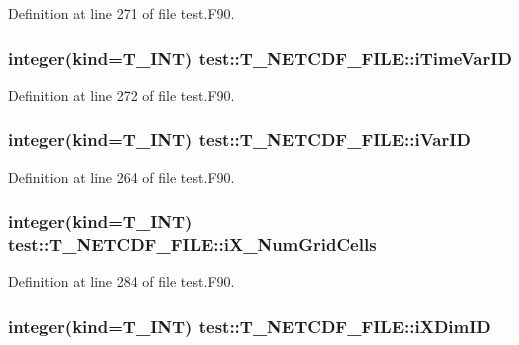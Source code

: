 Definition at line 271 of file test.F90.

\hypertarget{typetest_1_1_t___n_e_t_c_d_f___f_i_l_e_a1d3d22226f3c6ade469df5560926f3c7}{
\subsubsection[{iTimeVarID}]{\setlength{\rightskip}{0pt plus 5cm}integer(kind={\bf T\_\-INT}) {\bf test::T\_\-NETCDF\_\-FILE::iTimeVarID}}}
\label{typetest_1_1_t___n_e_t_c_d_f___f_i_l_e_a1d3d22226f3c6ade469df5560926f3c7}


Definition at line 272 of file test.F90.

\hypertarget{typetest_1_1_t___n_e_t_c_d_f___f_i_l_e_a56a2cb10e94b6f2e3cbf5560c0762bf6}{
\subsubsection[{iVarID}]{\setlength{\rightskip}{0pt plus 5cm}integer(kind={\bf T\_\-INT}) {\bf test::T\_\-NETCDF\_\-FILE::iVarID}}}
\label{typetest_1_1_t___n_e_t_c_d_f___f_i_l_e_a56a2cb10e94b6f2e3cbf5560c0762bf6}


Definition at line 264 of file test.F90.

\hypertarget{typetest_1_1_t___n_e_t_c_d_f___f_i_l_e_a2e8fa831b376d9295f1a192e123244c2}{
\subsubsection[{iX\_\-NumGridCells}]{\setlength{\rightskip}{0pt plus 5cm}integer(kind={\bf T\_\-INT}) {\bf test::T\_\-NETCDF\_\-FILE::iX\_\-NumGridCells}}}
\label{typetest_1_1_t___n_e_t_c_d_f___f_i_l_e_a2e8fa831b376d9295f1a192e123244c2}


Definition at line 284 of file test.F90.

\hypertarget{typetest_1_1_t___n_e_t_c_d_f___f_i_l_e_a498272cebe39a4cc52db0bc4ed44ddc8}{
\subsubsection[{iXDimID}]{\setlength{\rightskip}{0pt plus 5cm}integer(kind={\bf T\_\-INT}) {\bf test::T\_\-NETCDF\_\-FILE::iXDimID}}}
\label{typetest_1_1_t___n_e_t_c_d_f___f_i_l_e_a498272cebe39a4cc52db0bc4ed44ddc8}


